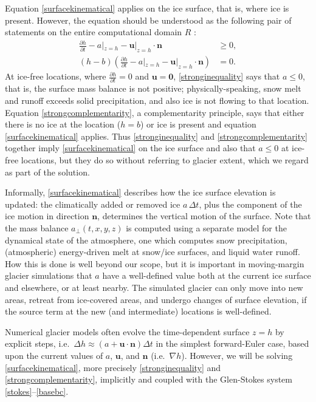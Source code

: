 \documentclass[letterpaper,final,12pt,reqno]{amsart}
\newcommand{\grad}{\nabla}
\newcommand{\bn}{\mathbf{n}}
\newcommand{\bu}{\mathbf{u}}
\newcommand{\bzero}{\bm{0}}
\begin{document}
Equation \eqref{surfacekinematical} applies on the ice surface, that is, where ice is present.  However, the equation should be understood as the following pair of statements on the entire computational domain $R$ \cite{Bueler2016,Bueler2020,SchoofHewitt2013}:
\begin{align}
\frac{\partial h}{\partial t} - a|_{z=h} - \bu|_{z=h} \cdot \bn &\ge 0, \label{stronginequality} \\
(h-b) \left(\frac{\partial h}{\partial t} - a|_{z=h} - \bu|_{z=h} \cdot \bn\right) &= 0. \label{strongcomplementarity}
\end{align}
At ice-free locations, where $\frac{\partial h}{\partial t}=0$ and $\bu=\bzero$, \eqref{stronginequality} says that $a \le 0$, that is, the surface mass balance is not positive; physically-speaking, snow melt and runoff exceeds solid precipitation, and also ice is not flowing to that location.  Equation \eqref{strongcomplementarity}, a complementarity principle, says that either there is no ice at the location ($h=b$) or ice is present and equation \eqref{surfacekinematical} applies.  Thus \eqref{stronginequality} and \eqref{strongcomplementarity} together imply \eqref{surfacekinematical} on the ice surface and also that $a\le 0$ at ice-free locations, but they do so without referring to glacier extent, which we regard as part of the solution.

Informally, \eqref{surfacekinematical} describes how the ice surface elevation is updated: the climatically added or removed ice $a\,\Delta t$, plus the component of the ice motion in direction $\bn$, determines the vertical motion of the surface.  Note that the mass balance $a_{\perp}(t,x,y,z)$ is computed using a separate model for the dynamical state of the atmosphere, one which computes snow precipitation, (atmospheric) energy-driven melt at snow/ice surfaces, and liquid water runoff.  How this is done is well beyond our scope, but it is important in moving-margin glacier simulations that $a$ have a well-defined value both at the current ice surface and elsewhere, or at least nearby.  The simulated glacier can only move into new areas, retreat from ice-covered areas, and undergo changes of surface elevation, if the source term at the new (and intermediate) locations is well-defined.

Numerical glacier models often evolve the time-dependent surface $z=h$ by explicit steps, i.e.~$\Delta h \approx \left(a + \bu\cdot \bn\right) \Delta t$ in the simplest forward-Euler case, based upon the current values of $a$, $\bu$, and $\bn$ (i.e.~$\grad h$).  However, we will be solving \eqref{surfacekinematical}, more precisely \eqref{stronginequality} and \eqref{strongcomplementarity}, implicitly and coupled with the Glen-Stokes system \eqref{stokes}--\eqref{basebc}.
\end{document}
